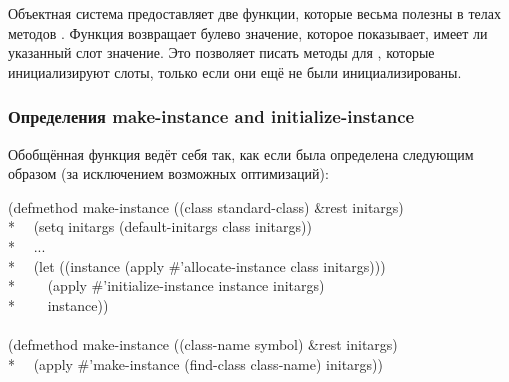 Объектная система предоставляет две функции, которые весьма полезны в телах
методов . Функция  возвращает булево
значение, которое показывает, имеет ли указанный слот значение. Это позволяет
писать  методы для , которые инициализируют
слоты, только если они ещё не были инициализированы.

\subsubsection{Определения make-instance and initialize-instance}

Обобщённая функция  ведёт себя так, как если была определена
следующим образом (за исключением возможных оптимизаций):

\begin{lisp}
(defmethod make-instance ((class standard-class) \&rest initargs) \\*
~~(setq initargs (default-initargs class initargs)) \\*
~~... \\*
~~(let ((instance (apply \#'allocate-instance class initargs))) \\*
~~~~(apply \#'initialize-instance instance initargs) \\*
~~~~instance)) \\
\\
(defmethod make-instance ((class-name symbol) \&rest initargs) \\*
~~(apply \#'make-instance (find-class class-name) initargs))
\end{lisp}


